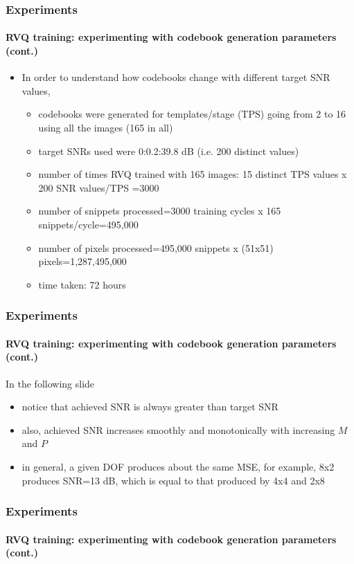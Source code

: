 \begin{frame}
\frametitle{Experiments}
\framesubtitle{RVQ training: experimenting with codebook generation parameters (cont.)}
\mypagenum
	\begin{itemize}
		\item In order to understand how codebooks change with different target SNR values,
			\begin{itemize}
				\item codebooks were generated for templates/stage (TPS) going from 2 to 16 using all the images (165 in all)	
				\item target SNRs used were 0:0.2:39.8 dB (i.e. 200 distinct values)
				\item number of times RVQ trained with 165 images: 15 distinct TPS values x 200 SNR values/TPS =3000
				\item number of snippets processed=3000 training cycles x 165 snippets/cycle=495,000
				\item number of pixels processed=495,000 snippets x (51x51) pixels=1,287,495,000
				\item time taken: 72 hours
			\end{itemize}
	\end{itemize}
\end{frame}



\begin{frame}
\frametitle{Experiments}
\framesubtitle{RVQ training: experimenting with codebook generation parameters (cont.)}
\mypagenum
	In the following slide	
		\begin{itemize}
			\item notice that achieved SNR is always greater than target SNR
			\item also, achieved SNR increases smoothly and monotonically with increasing $M$ and $P$
			\item in general, a given DOF produces about the same MSE, for example, 8x2 produces SNR=13 dB, which is equal to that produced by 4x4 and 2x8 
		\end{itemize}
\end{frame}



\begin{frame}
\frametitle{Experiments}
\framesubtitle{RVQ training: experimenting with codebook generation parameters (cont.)}
\mypagenum	
\end{frame}



